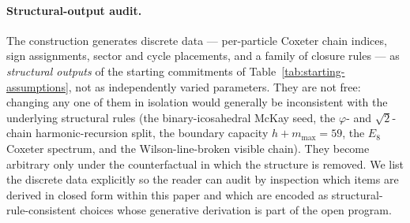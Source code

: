 ﻿\documentclass[reprint,amsmath,amssymb,aps,prd,longbibliography,floatfix]{revtex4-2}
\begin{document}
\paragraph{Structural-output audit.}
\label{subsec:discrete-audit}
The construction generates discrete data --- per-particle Coxeter
chain indices, sign assignments, sector and cycle placements, and a
family of closure rules --- as \emph{structural outputs} of the
starting commitments of Table~\ref{tab:starting-assumptions}, not as
independently varied parameters. They are not free: changing any one
of them in isolation would generally be inconsistent with the
underlying structural rules (the binary-icosahedral McKay seed, the
$\varphi$- and $\sqrt{2}$-chain harmonic-recursion split, the
boundary capacity $h+m_{\max}=59$, the $E_8$ Coxeter spectrum, and
the Wilson-line-broken visible chain). They become arbitrary only
under the counterfactual in which the structure is removed. We list
the discrete data explicitly so the reader can audit by inspection
which items are derived in closed form within this paper and which
are encoded as structural-rule-consistent choices whose generative
derivation is part of the open program.
\end{document}
